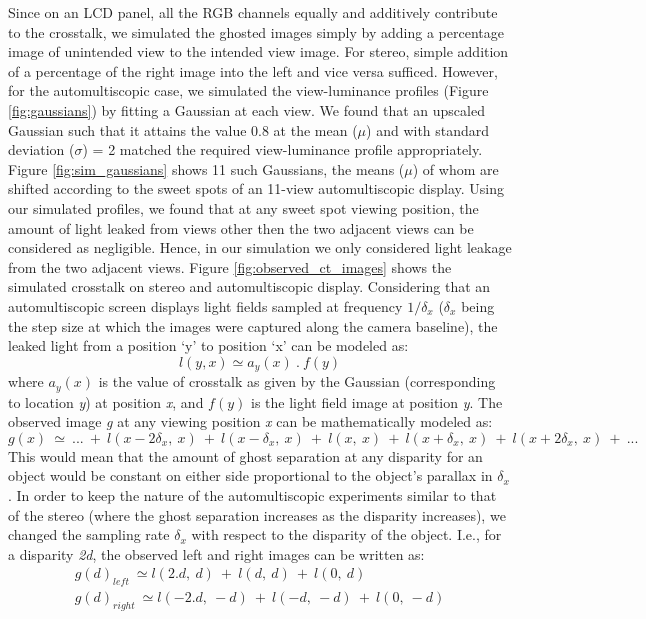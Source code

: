 Since on an LCD panel, all the RGB channels equally and additively contribute to the crosstalk, we simulated the ghosted images simply by adding a percentage image of unintended view to the intended view image. For stereo, simple addition of a percentage of the right image into the left and vice versa sufficed. However, for the automultiscopic case, we simulated the view-luminance profiles (Figure \ref{fig:gaussians}) by fitting a Gaussian at each view. We found that an upscaled Gaussian such that it attains the value 0.8 at the mean ($\mu$) and with standard deviation ($\sigma$) = 2 matched the required view-luminance profile appropriately. Figure \ref{fig:sim_gaussians} shows 11 such Gaussians, the means ($\mu$) of whom are shifted according to the sweet spots of an 11-view automultiscopic display. Using our simulated profiles, we found that at any sweet spot viewing position, the amount of light leaked from views other then the two adjacent views can be considered as negligible. Hence, in our simulation we only considered light leakage from the two adjacent views. Figure \ref{fig:observed_ct_images} shows the simulated crosstalk on stereo and automultiscopic display. Considering that an automultiscopic screen displays light fields sampled at frequency $1/\delta_x$ ($\delta_x$ being the step size at which the images were captured along the camera baseline), the leaked light from a position `y' to position `x' can be modeled as:
\begin{equation}
l(y,x) \simeq a_y(x)\:.\:f(y)
\label{eq:ct_leak_eq}
\end{equation}
where $a_y(x)$ is the value of crosstalk as given by the Gaussian (corresponding to location \emph{y}) at position \emph{x}, and $f(y)$ is the light field image at position \emph{y}. The observed image \emph{g} at any viewing position \emph{x} can be mathematically modeled as:
\begin{equation}
g(x) \: \simeq \: ...\: +\: l(x-2\delta_x,\:x)\:+\: l(x-\delta_x,\:x)\:+\:l(x,\:x)\:+\: l(x+\delta_x,\:x)\:+\: l(x+2\delta_x,\:x)\:+ \:...
\label{eq:ct_sim_eq}
\end{equation}
This would mean that the amount of ghost separation at any disparity for an object would be constant on either side proportional to the object's parallax in $\delta_x$. In order to keep the nature of the automultiscopic experiments similar to that of the stereo (where the ghost separation increases as the disparity increases), we changed the sampling rate $\delta_x$ with respect to the disparity of the object. I.e., for a disparity \emph{2d}, the observed left and right images can be written as:
\begin{equation}
\begin{aligned}
g(d)_{left} \: \simeq l(2.d,\:d)\:+\: l(d,\:d)\:+\:l(0,\:d) \\
g(d)_{right} \: \simeq l(-2.d,\:-d)\:+\: l(-d,\:-d)\:+\:l(0,\:-d)
\end{aligned}
\label{eq:auto_obs_imgs}
\end{equation}

